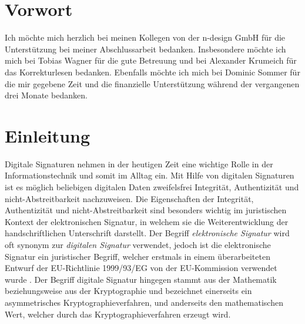\documentclass[11pt,a4paper,ngerman]{scrreprt}
\begin{document}



\chapter*{Vorwort}
Ich möchte mich herzlich bei meinen Kollegen von der n-design GmbH für die Unterstützung bei meiner Abschlussarbeit bedanken. Insbesondere möchte ich mich bei Tobias Wagner für die gute Betreuung und bei Alexander Krumeich für das Korrekturlesen bedanken. Ebenfalls möchte ich mich bei Dominic Sommer für die mir gegebene Zeit und die finanzielle Unterstützung während der vergangenen drei Monate bedanken.
\clearpage

\tableofcontents
\clearpage

\chapter{Einleitung}
Digitale Signaturen nehmen in der heutigen Zeit eine wichtige Rolle in der Informationstechnik und somit im Alltag ein. Mit Hilfe von digitalen Signaturen ist es möglich beliebigen digitalen Daten zweifelsfrei Integrität, Authentizität und nicht-Abstreitbarkeit nachzuweisen. Die Eigenschaften der Integrität, Authentizität und nicht-Abstreitbarkeit sind besonders wichtig im juristischen Kontext der elektronischen Signatur, in welchem sie die Weiterentwicklung der handschriftlichen Unterschrift darstellt. Der Begriff \emph{elektronische Signatur} wird oft synonym zur \emph{digitalen Signatur} verwendet, jedoch ist die elektronische Signatur ein juristischer Begriff, welcher erstmals in einem überarbeiteten Entwurf der EU-Richtlinie 1999/93/EG von der EU-Kommission verwendet wurde \cite{eSigEU99}. Der Begriff digitale Signatur hingegen stammt aus der Mathematik beziehungsweise aus der Kryptographie und bezeichnet einerseits ein asymmetrisches Kryptographieverfahren, und anderseits den mathematischen Wert, welcher durch das Kryptographieverfahren erzeugt wird.
\end{document}
